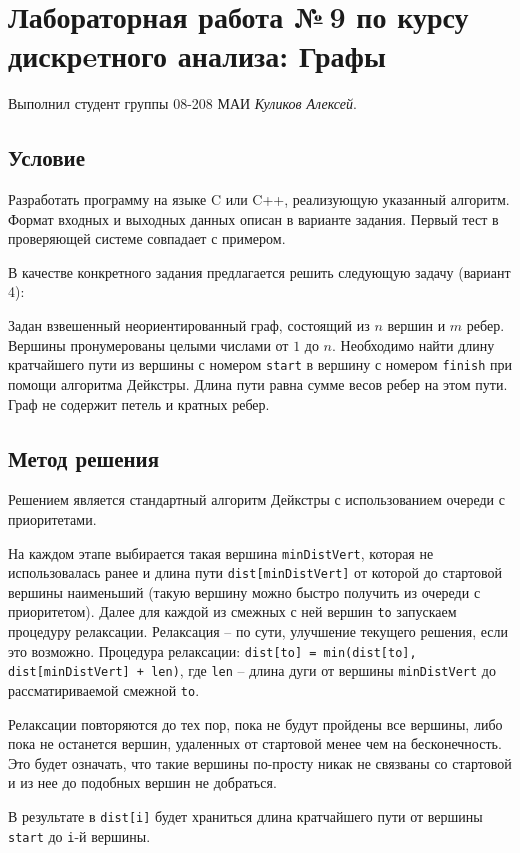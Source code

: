 \documentclass[12pt]{article}
\begin{document}
\section*{Лабораторная работа №\,9 по курсу дискрeтного анализа: Графы}

Выполнил студент группы 08-208 МАИ \textit{Куликов Алексей}.

\subsection*{Условие}
Разработать программу на языке C или C++, реализующую указанный
алгоритм. Формат входных и выходных данных описан в варианте
задания. Первый тест в проверяющей системе совпадает с примером.

 В качестве конкретного задания предлагается решить следующую задачу (вариант 4): 

Задан взвешенный неориентированный граф, состоящий из $n$ вершин и $m$
ребер. Вершины пронумерованы целыми числами от $1$ до $n$. Необходимо
найти длину кратчайшего пути из вершины с номером \verb|start| в вершину с
номером \verb|finish| при помощи алгоритма Дейкстры. Длина пути равна
сумме весов ребер на этом пути. Граф не содержит петель и кратных
ребер.

\subsection*{Метод решения}

Решением является стандартный алгоритм Дейкстры с использованием очереди с приоритетами.

На каждом этапе выбирается такая вершина \verb|minDistVert|, которая не использовалась ранее и длина пути \verb|dist[minDistVert]| от которой до стартовой вершины наименьший (такую вершину можно быстро получить из очереди с приоритетом). Далее для каждой из смежных с ней вершин \verb|to| запускаем процедуру релаксации. Релаксация -- по сути, улучшение текущего решения, если это возможно. Процедура релаксации: \verb|dist[to] = min(dist[to], dist[minDistVert] + len)|, где \verb|len| -- длина дуги от вершины \verb|minDistVert| до рассматириваемой смежной \verb|to|.

Релаксации повторяются до тех пор, пока не будут пройдены все вершины, либо пока не останется вершин, удаленных от стартовой менее чем на бесконечность. Это будет означать, что такие вершины по-просту никак не связваны со стартовой и из нее до подобных вершин не добраться.

В результате в \verb|dist[i]| будет храниться длина кратчайшего пути от вершины \verb|start| до \verb|i|-й вершины. 
\end{document}
